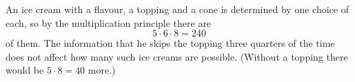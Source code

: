 An ice cream with a flavour, a topping and a cone is determined by one choice of each, so by the multiplication principle there are
\[5\cdot6\cdot8=\boxed{240}\]
of them. The information that he skips the topping three quarters of the time does not affect how many such ice creams are possible. (Without a topping there would be $5\cdot8=40$ more.)
